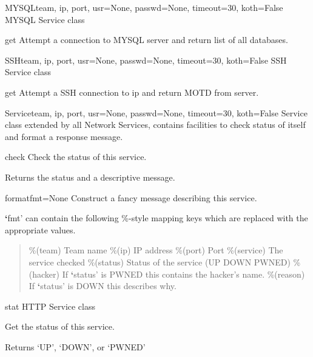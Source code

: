 \documentclass[letterpaper,10pt,english]{manual}
\begin{document}
\hypertarget{xscore.checkers.MYSQL}{}\begin{classdesc}{MYSQL}{team, ip, port, usr=None, passwd=None, timeout=30, koth=False}
MYSQL Service class

\hypertarget{xscore.checkers.MYSQL.get}{}\begin{methoddesc}{get}{}
Attempt a connection to MYSQL server and return list of all databases.
\end{methoddesc}
\end{classdesc}

\hypertarget{xscore.checkers.SSH}{}\begin{classdesc}{SSH}{team, ip, port, usr=None, passwd=None, timeout=30, koth=False}
SSH Service class

\hypertarget{xscore.checkers.SSH.get}{}\begin{methoddesc}{get}{}
Attempt a SSH connection to ip and return MOTD from server.
\end{methoddesc}
\end{classdesc}

\hypertarget{xscore.checkers.Service}{}\begin{classdesc}{Service}{team, ip, port, usr=None, passwd=None, timeout=30, koth=False}
Service class extended by all Network Services, contains facilities
to check status of itself and format a response message.

\hypertarget{xscore.checkers.Service.check}{}\begin{methoddesc}{check}{}
Check the status of this service.

Returns the status and a descriptive message.
\end{methoddesc}

\hypertarget{xscore.checkers.Service.format}{}\begin{methoddesc}{format}{fmt=None}
Construct a fancy message describing this service.

{\color{red}\bfseries{}{}`}fmt' can contain the following \%-style mapping keys which are 
replaced with the appropriate values.
\begin{quote}

\%(team)     Team name
\%(ip)       IP address
\%(port)     Port
\%(service)  The service checked
\%(status)   Status of the service (UP \textbar{} DOWN \textbar{} PWNED)
\%(hacker)   If {\color{red}\bfseries{}{}`}status' is PWNED this contains the hacker's name.
\%(reason)   If {\color{red}\bfseries{}{}`}status' is DOWN this describes why.
\end{quote}
\end{methoddesc}

\hypertarget{xscore.checkers.Service.stat}{}\begin{methoddesc}{stat}{}
HTTP Service class

Get the status of this service.

Returns `UP', `DOWN', or `PWNED'
\end{methoddesc}
\end{classdesc}
\end{document}
